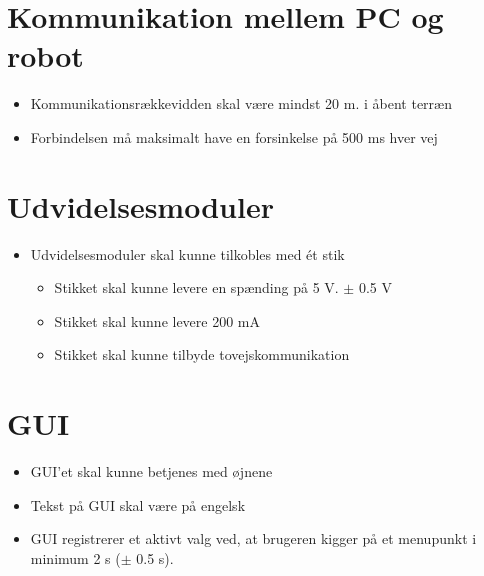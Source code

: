 \section{Kommunikation mellem PC og robot}
\begin{itemize}
	\item Kommunikationsrækkevidden skal være mindst 20 m. i åbent terræn
	\item Forbindelsen må maksimalt have en forsinkelse på 500 ms hver vej
\end{itemize}

\section{Udvidelsesmoduler}
\begin{itemize}
	\item Udvidelsesmoduler skal kunne tilkobles med ét stik
	\begin{itemize}
		\item Stikket skal kunne levere en spænding på 5 V. $\pm$ 0.5 V
		\item Stikket skal kunne levere 200 mA
		\item Stikket skal kunne tilbyde tovejskommunikation
	\end{itemize}
\end{itemize}

\section{GUI}
\begin{itemize}
	\item GUI'et skal kunne betjenes med øjnene
	\item Tekst på GUI skal være på engelsk
	\item GUI registrerer et aktivt valg ved, at brugeren kigger på et menupunkt i minimum 2 s ($\pm$ 0.5 s).
\end{itemize}